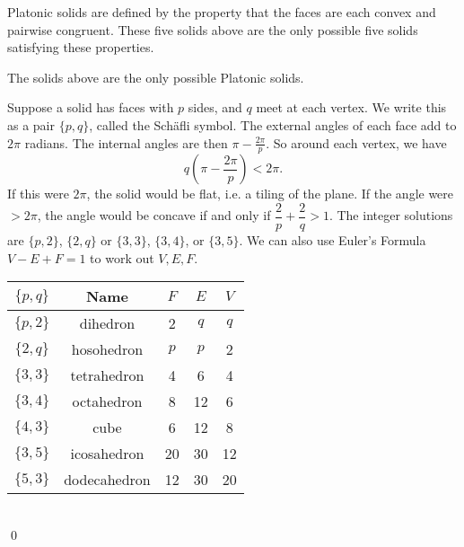 


Platonic solids are defined by the property that the faces are each convex and pairwise congruent. These five solids above are the only possible five solids satisfying these properties. 


\begin{prop}
The solids above are the only possible Platonic solids.
\end{prop}

\pf Suppose a solid has faces with $p$ sides, and $q$ meet at each vertex. We write this as a pair $\{p,q\}$, called the Sch\"afli symbol. The external angles of each face add to $2\pi$ radians. The internal angles are then $\pi - \frac{2\pi}{p}$. So around each vertex, we have
	\[
	q \left( \pi - \dfrac{2\pi}{p}\right)< 2\pi.
	\]
If this were $2\pi$, the solid would be flat, i.e. a tiling of the plane. If the angle were $>2\pi$, the angle would be concave if and only if $\dfrac{2}{p} + \dfrac{2}{q}>1$. The integer solutions are $\{p,2\}$, $\{2,q\}$ or $\{3,3\}$, $\{3,4\}$, or $\{3,5\}$. We can also use Euler's Formula $V-E+F=1$ to work out $V,E, F$. 
	\begin{table}[h]
	\centering
	\begin{tabular}{ccccc}
	$\{p,q\}$ & Name & $F$ & $E$ & $V$ \\ \hline
	$\{p,2\}$ & dihedron & 2 & $q$ & $q$ \\
	$\{2,q\}$ & hosohedron & $p$ & $p$ & 2 \\
	$\{3,3\}$ & tetrahedron & 4 & 6 & 4 \\
	$\{3,4\}$ & octahedron & 8 & 12 & 6 \\
	$\{4,3\}$ & cube & 6 & 12 & 8 \\
	$\{3,5\}$ & icosahedron & 20 & 30 & 12 \\
	$\{5,3\}$ & dodecahedron & 12 & 30 & 20
	\end{tabular}
	\end{table} \\
\qed \\



